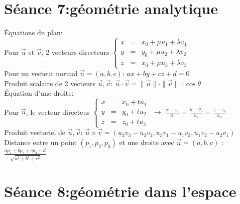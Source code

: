 \documentclass[12pt]{article}
\begin{document}
\section*{S\'eance 7:g\'eom\'etrie analytique}
\'Equations du plan: \\
\indent \indent Pour $\vec{u}$ et $\vec{v}$, 2 vecteurs directeurs
\(\left \lbrace
   \begin{array}{rcl}
      x & = & x_0+\mu u_1+\lambda v_1 \\
      y & = & y_0+ \mu u_2+\lambda v_2 \\
      z & = & x_0+ \mu u_3+\lambda v_3
   \end{array}
\right. \) \\ \newline
\indent \indent Pour un vecteur normal $\vec{n} = (a, b, c)$: $ax+by+cz+d=0$ \\ \newline
\indent Produit scalaire de 2 vecteurs $\vec{u}, \vec{v}$:
$\vec{u}\cdot\vec{v} = \|\vec{u}\| \cdot \|\vec{v}\| \cdot \cos{\theta}$ \\ \newline
\indent \'Equation d'une droite: \\
\indent \indent Pour $\vec{u}$, le vecteur directeur
\(\left \lbrace
	\begin{array}{rcl}
		x & = & x_0+tu_1 \\
		y & = & y_0+tu_2 \\
		z & = & z_0+tu_3
	\end{array} \right. \) $\rightarrow$ $\frac{x-x_0}{u_1} = \frac{y-y_0}{u_2} = \frac{z-z_0}{u_3}$ \\

\indent Produit vectoriel de $\vec{u}, \vec{v}$: $\vec{u} \times \vec{v} = (u_2v_3 - u_3v_2, u_3v_1 - u_1v_3, u_1v_2 - u_2v_1)$ \\

\indent Distance entre un point $(p_1, p_2, p_3)$ et une droite avec $\vec{n} = (a, b, c)$ : $\frac{ap_1+bp_2+cp_3+d}{\sqrt{a^2+b^2+c^2}}$
\section*{S\'eance 8:g\'eom\'etrie dans l'espace}
\end{document}
